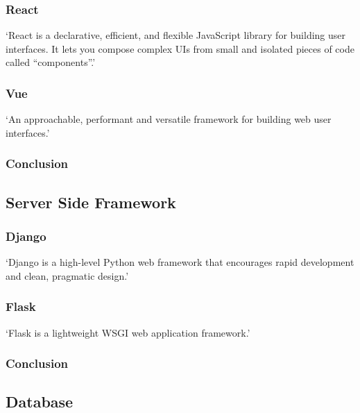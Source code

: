 \subsubsection*{React}
`React is a declarative, efficient, and flexible JavaScript library for building user interfaces. It lets you compose 
complex UIs from small and isolated pieces of code called “components”.'\cite{TutorialIntroReact}
\subsubsection*{Vue}
`An approachable, performant and versatile framework for building web user interfaces.'\cite{VueJsProgressive}
\subsubsection*{Conclusion}
\subsection{Server Side Framework}
\subsubsection*{Django}
`Django is a high-level Python web framework that encourages rapid development and clean, pragmatic design.'\cite{Django}
\subsubsection*{Flask}
`Flask is a lightweight WSGI web application framework.'\cite{ronacherFlaskSimpleFramework}
\subsubsection*{Conclusion}
\subsection{Database}
